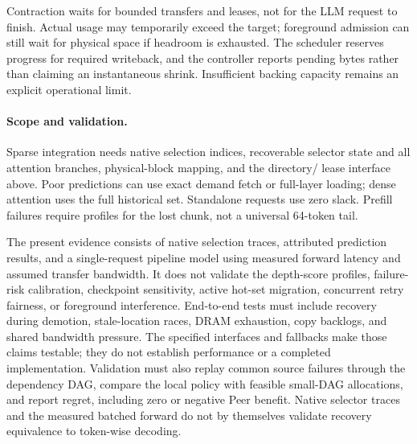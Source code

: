 Contraction waits for bounded transfers and leases, not for the LLM
request to finish. Actual usage may temporarily exceed the target;
foreground admission can still wait for physical space if headroom is
exhausted. The scheduler reserves progress for required writeback, and
the controller reports pending bytes rather than claiming an instantaneous
shrink. Insufficient backing capacity remains an explicit operational limit.
\paragraph{Scope and validation.}
\label{sec:design-discussion}
Sparse integration needs native selection indices, recoverable selector
state and all attention branches, physical-block mapping, and the directory/
lease interface above. Poor predictions can use exact demand fetch or
full-layer loading; dense attention uses the full historical set.
Standalone requests use zero slack. Prefill failures require profiles for
the lost chunk, not a universal 64-token tail.

The present evidence consists of native selection traces, attributed
prediction results, and a single-request pipeline model using measured
forward latency and assumed transfer bandwidth. It does
not validate the depth-score profiles, failure-risk calibration, checkpoint
sensitivity, active hot-set migration, concurrent retry fairness, or
foreground interference. End-to-end tests must include recovery during
demotion, stale-location races, DRAM exhaustion, copy backlogs, and shared
bandwidth pressure. The specified interfaces and fallbacks make those
claims testable; they do not establish performance or a completed implementation.
Validation must also replay common source failures through the dependency
DAG, compare the local policy with feasible small-DAG allocations, and
report regret, including zero or negative Peer benefit. Native selector
traces and the measured batched forward do not by themselves validate
recovery equivalence to token-wise decoding.
